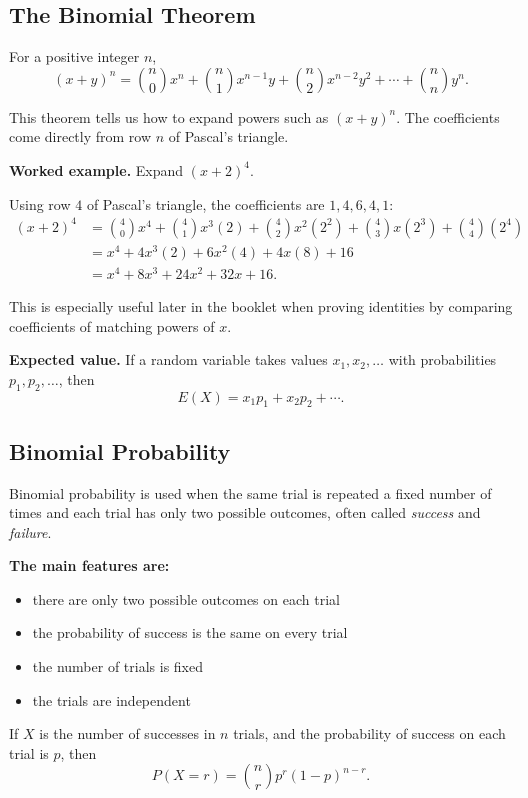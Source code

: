 \documentclass[12pt]{article}
\begin{document}
\subsection{The Binomial Theorem}
For a positive integer $n$,
\[
(x+y)^n=\binom{n}{0}x^n+\binom{n}{1}x^{n-1}y+\binom{n}{2}x^{n-2}y^2+\cdots+\binom{n}{n}y^n.
\]

This theorem tells us how to expand powers such as $(x+y)^n$. The coefficients come directly from row $n$ of Pascal's triangle.

\textbf{Worked example.} Expand $(x+2)^4$.

Using row $4$ of Pascal's triangle, the coefficients are $1,4,6,4,1$:
\begin{align*}
(x+2)^4
&= \binom{4}{0}x^4 + \binom{4}{1}x^3(2) + \binom{4}{2}x^2(2^2) + \binom{4}{3}x(2^3) + \binom{4}{4}(2^4) \\
&= x^4 + 4x^3(2) + 6x^2(4) + 4x(8) + 16 \\
&= x^4 + 8x^3 + 24x^2 + 32x + 16.
\end{align*}

This is especially useful later in the booklet when proving identities by comparing coefficients of matching powers of $x$.

\textbf{Expected value.} If a random variable takes values $x_1,x_2,\dots$ with probabilities $p_1,p_2,\dots$, then
\[
E(X)=x_1p_1+x_2p_2+\cdots.
\]

\subsection{Binomial Probability}
Binomial probability is used when the same trial is repeated a fixed number of times and each trial has only two possible outcomes, often called \textit{success} and \textit{failure}.

\textbf{The main features are:}
\begin{itemize}[leftmargin=*]
  \item there are only two possible outcomes on each trial
  \item the probability of success is the same on every trial
  \item the number of trials is fixed
  \item the trials are independent
\end{itemize}

If $X$ is the number of successes in $n$ trials, and the probability of success on each trial is $p$, then
\[
P(X=r)=\binom{n}{r}p^r(1-p)^{n-r}.
\]
\end{document}
